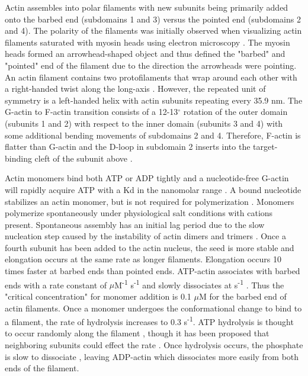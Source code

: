 Actin assembles into polar filaments with new subunits being primarily added onto the barbed end (subdomains 1 and 3) versus the pointed end (subdomains 2 and 4). The polarity of the filaments was initially observed when visualizing actin filaments saturated with myosin heads using electron microscopy \citep{huxley_electron_1963}. The myosin heads formed an arrowhead-shaped object and thus defined the "barbed" and "pointed" end of the filament due to the direction the arrowheads were pointing. An actin filament contains two protofilaments that wrap around each other with a right-handed twist along the long-axis \citep{hanson_structure_1963}. However, the repeated unit of symmetry is a left-handed helix with  actin subunits repeating every 35.9 nm. The G-actin to F-actin transition consists of a 12-13$^\circ$ rotation of the outer domain (subunits 1 and 2) with respect to the inner domain (subunits 3 and 4) with some additional bending movements of subdomains 2 and 4. Therefore, F-actin is flatter than G-actin and the D-loop in subdomain 2 inserts into the target-binding cleft of the subunit above \citep{dominguez_actin_2011}.

Actin monomers bind both ATP or ADP tightly and a nucleotide-free G-actin will rapidly acquire ATP with a Kd in the nanomolar range \citep{de_la_cruz_nucleotide-free_1995}. A bound nucleotide stabilizes an actin monomer, but is not required for polymerization \citep{pollard_actin_2016}. Monomers polymerize spontaneously under physiological salt conditions with cations present. Spontaneous assembly has an initial lag period due to the slow nucleation step caused by the instability of actin dimers and trimers \citep{cooper_kinetic_1983, frieden_polymerization_1983, sept_thermodynamics_2001}. Once a fourth subunit has been added to the actin nucleus, the seed is more stable and elongation occurs at the same rate as longer filaments. Elongation occurs 10 times faster at barbed ends than pointed ends. ATP-actin associates with barbed ends with a rate constant of  $\mu$M\textsuperscript{-1} s\textsuperscript{-1} and slowly dissociates at  s\textsuperscript{-1} \citep{pollard_rate_1986}. Thus the "critical concentration" for monomer addition is 0.1 $\mu$M for the barbed end of actin filaments. Once a monomer undergoes the conformational change to bind to a filament, the rate of hydrolysis increases to 0.3 s\textsuperscript{-1}. ATP hydrolysis is thought to occur randomly along the filament \citep{jeno_internal_1995}, though it has been proposed that neighboring subunits could effect the rate \citep{korn_actin_1987}. Once hydrolysis occurs, the phosphate is slow to dissociate \citep{carlier_direct_1986}, leaving ADP-actin which dissociates more easily from both ends of the filament. 

